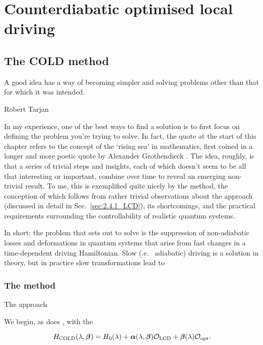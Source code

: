 \part{Counterdiabatic optimised local driving}

\chapter{The COLD method}\label{chap:4_COLD}

\epigraph{A good idea has a way of becoming simpler and solving problems other than that for which it was intended.}{Robert Tarjan}

In my experience, one of the best ways to find a solution is to first focus on defining the problem you're trying to solve. In fact, the quote at the start of this chapter refers to the concept of the `rising sea' in mathematics, first coined in a longer and more poetic quote by Alexander Grothendieck \cite{mclarty_grothendieck_nodate}. The idea, roughly, is that a series of trivial steps and insights, each of which doesn't seem to be all that interesting or important, combine over time to reveal an emerging non-trivial result. To me, this is exemplified quite nicely by the  method, the conception of which follows from rather trivial observations about the  approach (discussed in detail in Sec.~\ref{sec:2.4.1_LCD}), its shortcomings, and the practical requirements surrounding the controllability of realistic quantum systems. 

In short: the problem that  sets out to solve is the suppression of non-adiabatic losses and deformations in quantum systems that arise from fast changes in a time-dependent driving Hamiltonian. Slow (\@i.e.~ adiabatic) driving is a solution in theory, but in practice slow transformations lead to 

\section{The method}

The  approach 

We begin, as does , with the 

\begin{equation}\label{eq:expandedH}
H_{\rm COLD}(\lambda,\boldsymbol{\beta}) = H_0(\lambda) + {\boldsymbol \alpha}(\lambda,\boldsymbol{\beta}) \mathcal{O}_{\rm LCD} + \boldsymbol{\beta}(\lambda) \mathcal{O}_{\rm opt}.
\end{equation}

